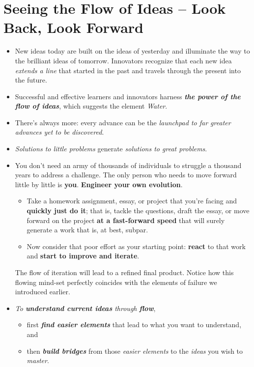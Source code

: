 \documentclass[11pt]{article}
\begin{document}
\section{Seeing the Flow of Ideas -- Look Back, Look Forward}
\begin{itemize}
\item New ideas today are built on the ideas of yesterday and illuminate the way to the brilliant ideas of tomorrow. Innovators recognize that each new idea \emph{extends a line} that started in the past and travels through the present into the future. 

\item Successful and effective learners and innovators harness \emph{\textbf{the power of the flow of ideas}}, which suggests the element \emph{Water}.

\item There’s always more: every advance can be the \emph{launchpad to far greater advances yet to be discovered}.

\item \emph{Solutions to little problems} generate \emph{solutions to great problems}.

\item \begin{exercise}
You don’t need an army of thousands of individuals to struggle a thousand years to address a challenge. The only person who needs to move forward little by little is \textbf{you}. \textbf{Engineer your own evolution}. 
\begin{itemize}
\item Take a homework assignment, essay, or project that you’re facing and \textbf{quickly just do it}; that is, tackle the questions, draft the essay, or move forward on the project \textbf{at a fast-forward speed} that will surely generate a work that is, at best, subpar. 

\item Now consider that poor effort as your starting point: \textbf{react} to that work and \textbf{start to improve and iterate}.
\end{itemize}
The flow of iteration will lead to a refined final product. Notice how this flowing mind-set perfectly coincides with the elements of failure we introduced earlier.
\end{exercise}

\item \emph{To \textbf{understand current ideas} through \textbf{flow}}, 
\begin{itemize}
\item first \emph{\textbf{find easier elements}} that lead to what you want to understand, and
\item then \emph{\textbf{build bridges}} from those \emph{easier elements} to the \emph{ideas} you wish to \emph{master}. 
\end{itemize}


\end{itemize}
\end{document}
